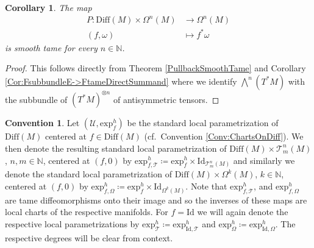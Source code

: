 \documentclass[12pt,a4paper]{article}
\theoremstyle{plain}
\newtheorem{corollary}[theorem]{Corollary}
\theoremstyle{definition}
\newtheorem{convention}[theorem]{Convention}
\newcommand{\N}{\mathbb{N}}
\newcommand{\tens}{\otimes}
\newcommand{\om}{\omega}
\newcommand{\Forms}[1]{\Omega^{#1}(M)}
\newcommand{\Diff}{\mathrm{Diff}(M)}
\newcommand{\exh}{\mathrm{exp}^h}
\newcommand{\Id}{\mathrm{Id}}
\newcommand{\Ucal}{\mathcal{U}}
\newcommand{\tensf}[2]{\mathcal{T}^{#1}_{#2}(M)}
\begin{document}
\begin{corollary}
\label{Cor:PullBackForms}
The map 
\begin{align*}
    P:\Diff \times \Forms{n}&\longrightarrow \Forms{n}\\
    (f,\om)&\longmapsto f^*\om
\end{align*}
is smooth tame for every $n\in \N$.
\end{corollary}
\begin{proof}
This follows directly from Theorem \ref{PullbackSmoothTame} and Corollary \ref{Cor:FsubbundleE->FtameDirectSummand} where we identify $\bigwedge^n(T^*M)$ with the subbundle of $(T^*M)^{\tens n}$ of antisymmetric tensors.
\end{proof}

\begin{convention}
\label{Conv:StandChartOnDifftimesTensOrForms}
Let $(\Ucal,\exh_f)$ be the standard local parametrization of $\Diff$ centered at $f\in \Diff$ (cf.~Convention \ref{Conv:ChartsOnDiff}). We then denote the resulting standard local parametrization of $\Diff \times \tensf{n}{m}$, $n,m \in \N$, centered at $(f,0)$ by
$\exh_{f,\mathcal T}\coloneqq \exh_f\times \mathrm{Id}_{\tensf{n}{m}}$ and similarly we denote the standard local parametrization of $\Diff \times \Forms{k}$, $k\in \N$, centered at $(f,0)$ by $\exh_{f,\Omega}\coloneqq \exh_f \times \mathrm{Id}_{\Forms{k}}$. Note that $\exh_{f,\mathcal T}$, and $\exh_{f,\Omega}$ are tame diffeomorphisms onto their image and so the inverses of these maps are local charts of the respective manifolds. For $f=\Id$ we will again denote the respective local parametrizations by $\exh_{\mathcal{T}}\coloneqq \exh_{\Id,\mathcal{T}}$ and $\exh_{\Omega}\coloneqq \exh_{\Id,\Omega}$. The respective degrees will be clear from context. 
\end{convention}
\end{document}
